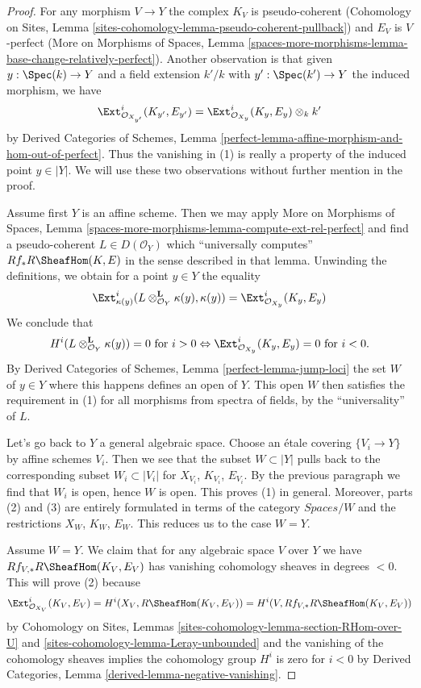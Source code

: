 \begin{proof}
For any morphism $V \to Y$ the complex $K_V$ is pseudo-coherent
(Cohomology on Sites, Lemma
\ref{sites-cohomology-lemma-pseudo-coherent-pullback})
and $E_V$ is $V$-perfect (More on Morphisms of Spaces, Lemma
\ref{spaces-more-morphisms-lemma-base-change-relatively-perfect}).
Another observation is that given $y : \Spec(k) \to Y$
and a field extension $k'/k$ with $y' : \Spec(k') \to Y$
the induced morphism, we have
$$
\Ext^i_{\mathcal{O}_{X_{y'}}}(K_{y'}, E_{y'}) =
\Ext^i_{\mathcal{O}_{X_y}}(K_y, E_y) \otimes_k k'
$$
by Derived Categories of Schemes, Lemma
\ref{perfect-lemma-affine-morphism-and-hom-out-of-perfect}.
Thus the vanishing in (1) is really a property of the induced
point $y \in |Y|$.
We will use these two observations without further mention in the proof.

\medskip\noindent
Assume first $Y$ is an affine scheme. Then we may apply
More on Morphisms of Spaces, Lemma
\ref{spaces-more-morphisms-lemma-compute-ext-rel-perfect}
and find a pseudo-coherent $L \in D(\mathcal{O}_Y)$ which
``universally computes'' $Rf_*R\SheafHom(K, E)$ in the sense
described in that lemma. Unwinding the definitions, we obtain
for a point $y \in Y$ the equality
$$
\Ext^i_{\kappa(y)}(L \otimes_{\mathcal{O}_Y}^\mathbf{L} \kappa(y),
\kappa(y)) = \Ext^i_{\mathcal{O}_{X_y}}(K_y, E_y)
$$
We conclude that
$$
H^i(L \otimes_{\mathcal{O}_Y}^\mathbf{L} \kappa(y)) = 0
\text{ for } i > 0 \Leftrightarrow
\Ext^i_{\mathcal{O}_{X_y}}(K_y, E_y) = 0 \text{ for }i < 0.
$$
By Derived Categories of Schemes, Lemma \ref{perfect-lemma-jump-loci}
the set $W$ of $y \in Y$ where this happens defines an open of $Y$.
This open $W$ then satisfies the requirement in (1) for all morphisms
from spectra of fields, by the ``universality'' of $L$.

\medskip\noindent
Let's go back to $Y$ a general algebraic space.
Choose an \'etale covering $\{V_i \to Y\}$ by affine schemes $V_i$.
Then we see that the subset $W \subset |Y|$ pulls back to the corresponding
subset $W_i \subset |V_i|$ for $X_{V_i}$, $K_{V_i}$, $E_{V_i}$.
By the previous paragraph we find that $W_i$ is open, hence $W$ is open.
This proves (1) in general. Moreover, parts (2) and (3) are entirely formulated
in terms of the category $\textit{Spaces}/W$ and the restrictions
$X_W$, $K_W$, $E_W$. This reduces us to the case $W = Y$.

\medskip\noindent
Assume $W = Y$. We claim that for any algebraic space $V$ over $Y$
we have $Rf_{V, *}R\SheafHom(K_V, E_V)$ has vanishing cohomology
sheaves in degrees $< 0$. This will prove (2) because
$$
\Ext^i_{\mathcal{O}_{X_V}}(K_V, E_V) =
H^i(X_V, R\SheafHom(K_V, E_V)) =
H^i(V, Rf_{V, *}R\SheafHom(K_V, E_V))
$$
by Cohomology on Sites, Lemmas
\ref{sites-cohomology-lemma-section-RHom-over-U} and
\ref{sites-cohomology-lemma-Leray-unbounded}
and the vanishing of the cohomology sheaves implies the
cohomology group $H^i$ is zero for $i < 0$ by
Derived Categories, Lemma \ref{derived-lemma-negative-vanishing}.


\end{proof}
